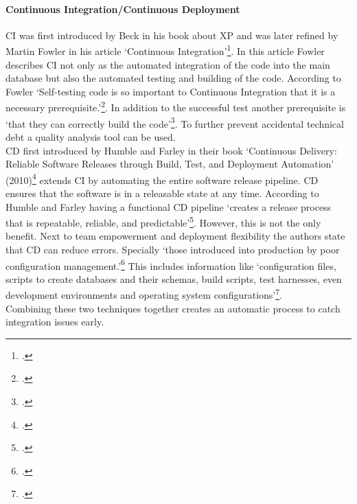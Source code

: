 \paragraph{Continuous Integration/Continuous Deployment}
\ac{CI} was first introduced by Beck in his book about \ac{XP} and was later refined by Martin Fowler in his article `Continuous Integration'\footcite{ContinuousIntegration}.
In this article Fowler describes \ac{CI} not only as the automated integration of the code into the main database but also the automated testing and building of the code.
According to Fowler `Self-testing code is so important to Continuous Integration that it is a necessary prerequisite.'\footcite{ContinuousIntegration}.
In addition to the successful test another prerequisite is `that they can correctly build the code'\footcite{ContinuousIntegration}.
To further prevent accidental technical debt a quality analysis tool can be used.\\
\ac{CD} first introduced by Humble and Farley in their book `Continuous Delivery: Reliable Software Releases through Build, Test, and Deployment Automation' (2010)\footcite{humbleContinuousDeliveryReliable2010}
extends \ac{CI} by automating the entire software release pipeline. \ac{CD} ensures that the software is in a releasable state at any time.
According to Humble and Farley having a functional \ac{CD} pipeline `creates a release process that is repeatable, reliable, and predictable'\footcite[17]{humbleContinuousDeliveryReliable2010}.
However, this is not the only benefit. Next to team empowerment and deployment flexibility the authors state that \ac{CD} can reduce errors.
Specially `those introduced into production by poor configuration management.'\footcite[18]{humbleContinuousDeliveryReliable2010}
This includes information like `configuration files, scripts to create databases and their schemas, build scripts, test harnesses, even development environments and operating system configurations'\footcite[19]{humbleContinuousDeliveryReliable2010}.\\
Combining these two techniques together creates an automatic process to catch integration issues early.






